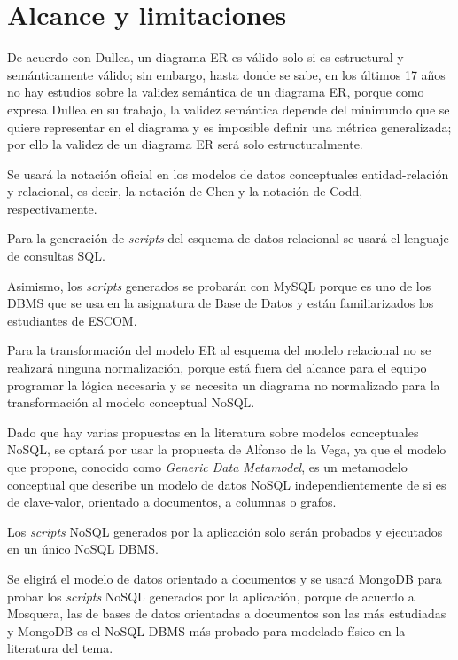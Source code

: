 \section{Alcance y limitaciones}

De acuerdo con Dullea\cite{dullea_analysis_2003}, un diagrama ER es válido solo si es estructural y semánticamente válido; sin embargo, hasta donde se sabe, en los últimos 17 años no hay estudios sobre la validez semántica de un diagrama ER, porque como expresa Dullea en su trabajo, la validez semántica depende del minimundo que se quiere representar en el diagrama y es imposible definir una métrica generalizada; por ello la validez de un diagrama ER será solo estructuralmente.


Se usará la notación oficial en los modelos de datos conceptuales entidad-relación y relacional, es decir, la notación de Chen y la notación de Codd, respectivamente.


Para la generación de \textit{scripts} del esquema de datos relacional se usará el lenguaje de consultas SQL.


Asimismo, los \textit{scripts} generados se probarán con MySQL porque es uno de los DBMS que se usa en la asignatura de Base de Datos y están familiarizados los estudiantes de ESCOM.


Para la transformación del modelo ER al esquema del modelo relacional no se realizará ninguna normalización, porque está fuera del alcance para el equipo programar la lógica necesaria y se necesita un diagrama no normalizado para la transformación al modelo conceptual NoSQL.


Dado que hay varias propuestas en la literatura sobre modelos conceptuales NoSQL, se optará por usar la propuesta de Alfonso de la Vega\cite{de_la_vega_mortadelo_2020}, ya que el modelo que propone, conocido como \textit{Generic Data Metamodel}, es un metamodelo conceptual que describe un modelo de datos NoSQL independientemente de si es de clave-valor, orientado a documentos, a columnas o grafos.


Los \textit{scripts} NoSQL generados por la aplicación solo serán probados y ejecutados en un único NoSQL DBMS.


Se eligirá el modelo de datos orientado a documentos y se usará MongoDB para probar los \textit{scripts} NoSQL generados por la aplicación, porque de acuerdo a Mosquera\cite{martinez-mosquera_modeling_2020}, las de bases de datos orientadas a documentos son las más estudiadas y MongoDB es el NoSQL DBMS más probado para modelado físico en la literatura del tema.


